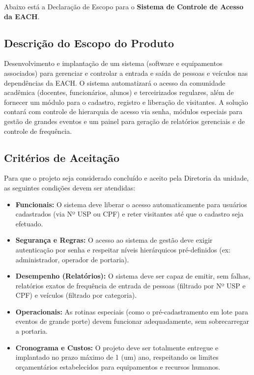 \documentclass[a4paper]{article}
\begin{document}
Abaixo está a Declaração de Escopo para o \textbf{Sistema de Controle de Acesso da EACH}.

\subsection{Descrição do Escopo do Produto}

Desenvolvimento e implantação de um sistema (software e equipamentos associados) para gerenciar e controlar a entrada e saída de pessoas e veículos nas dependências da EACH. O sistema automatizará o acesso da comunidade acadêmica (docentes, funcionários, alunos) e terceirizados regulares, além de fornecer um módulo para o cadastro, registro e liberação de visitantes. A solução contará com controle de hierarquia de acesso via senha, módulos especiais para gestão de grandes eventos e um painel para geração de relatórios gerenciais e de controle de frequência.

\subsection{Critérios de Aceitação}

Para que o projeto seja considerado concluído e aceito pela Diretoria da unidade, as seguintes condições devem ser atendidas:

\begin{itemize}
    \item \textbf{Funcionais:} O sistema deve liberar o acesso automaticamente para usuários cadastrados (via Nº USP ou CPF) e reter visitantes até que o cadastro seja efetuado.
    \item \textbf{Segurança e Regras:} O acesso ao sistema de gestão deve exigir autenticação por senha e respeitar níveis hierárquicos pré-definidos (ex: administrador, operador de portaria).
    \item \textbf{Desempenho (Relatórios):} O sistema deve ser capaz de emitir, sem falhas, relatórios exatos de frequência de entrada de pessoas (filtrado por Nº USP e CPF) e veículos (filtrado por categoria).
    \item \textbf{Operacionais:} As rotinas especiais (como o pré-cadastramento em lote para eventos de grande porte) devem funcionar adequadamente, sem sobrecarregar a portaria.
    \item \textbf{Cronograma e Custos:} O projeto deve ser totalmente entregue e implantado no prazo máximo de 1 (um) ano, respeitando os limites orçamentários estabelecidos para equipamentos e recursos humanos.
\end{itemize}
\end{document}
